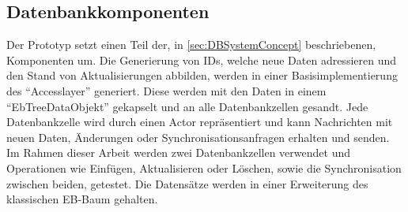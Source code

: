 \documentclass[a4paper,11pt,oneside,%
headsepline,												%
footsepline,												%
bibtotocnumbered									%
]{scrreprt}
\begin{document}
\subsection{Datenbankkomponenten}
Der Prototyp setzt einen Teil der, in \autoref{sec:DBSystemConcept} beschriebenen, Komponenten um. Die Generierung von \ac{ID}s, welche neue Daten adressieren und den Stand von Aktualisierungen abbilden, werden in einer Basisimplementierung des \enquote{Accesslayer} generiert. Diese werden mit den Daten in einem \enquote{EbTreeDataObjekt} gekapselt und an alle Datenbankzellen gesandt. Jede Datenbankzelle wird durch einen Actor repräsentiert und kann Nachrichten mit neuen Daten, Änderungen oder Synchronisationsanfragen erhalten und senden. Im Rahmen dieser Arbeit werden zwei Datenbankzellen verwendet und Operationen wie Einfügen, Aktualisieren oder Löschen, sowie die Synchronisation zwischen beiden, getestet. Die Datensätze werden in einer Erweiterung des klassischen \ac{EB-Baum} gehalten.
\end{document}
